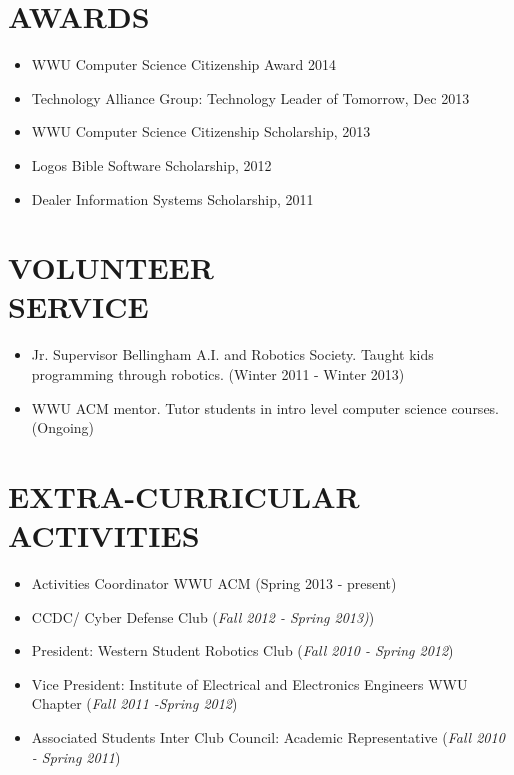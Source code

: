 \documentclass[line,margin]{res}
\begin{document}
\begin{resume}

	
\section{AWARDS}
	\begin{itemize} \itemsep -1pt
		\item WWU Computer Science Citizenship Award 2014
		\item Technology Alliance Group: Technology Leader of Tomorrow, Dec 2013
		\item WWU Computer Science Citizenship Scholarship, 2013
		\item Logos Bible Software Scholarship, 2012
		\item Dealer Information Systems Scholarship, 2011
	\end{itemize}
 
\section{VOLUNTEER \\ SERVICE}
		\begin{itemize} \itemsep -1pt
			\item Jr. Supervisor Bellingham A.I. and Robotics Society.  Taught kids programming through robotics. (Winter 2011 - Winter 2013)
			\item WWU ACM mentor.  Tutor students in intro level computer science courses.  (Ongoing)
		\end{itemize}

\section{EXTRA-CURRICULAR \\ ACTIVITIES} 
	\begin{itemize} \itemsep -1pt
	\item Activities Coordinator WWU ACM (Spring 2013 - present)
	\item CCDC/ Cyber Defense Club ({\sl Fall 2012 - Spring 2013)})
	\item President: Western Student Robotics Club ({\sl Fall 2010 - Spring 2012})
 	\item Vice President: Institute of Electrical and Electronics Engineers WWU Chapter ({\sl Fall 2011 -Spring 2012})
	\item Associated Students Inter Club Council: Academic Representative ({\sl Fall 2010 - Spring 2011})
	\end{itemize}
\end{resume}
\end{document}
